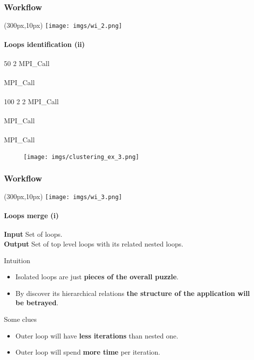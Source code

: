 \documentclass{beamer}
\begin{document}
\begin{frame}
\frametitle{Workflow}
\begin{textblock*}{5cm}(300px,10px) %
	\texttt{[image: imgs/wi\_2.png]}
\end{textblock*}
\framesubtitle{Loops identification (ii)}
\begin{multicols}{2}
		\begin{pseudocode}{ }{ }
			  50 \DO
			\BEGIN
				  2 \DO
				\BEGIN
					MPI\_Call \\
				\END \\
				MPI\_Call\\
			\END\\
			  100 \DO
			\BEGIN
				  2 \DO
				\BEGIN
					  2 \DO
					\BEGIN
						MPI\_Call \\
					\END\\
					MPI\_Call\\
				\END \\
				MPI\_Call\\
			\END
		\end{pseudocode}
	\columnbreak
	
	\columnbreak
	\pause
	\begin{figure}
		\texttt{[image: imgs/clustering\_ex\_3.png]}
	\end{figure}
\end{multicols}
\end{frame}

\begin{frame}
\frametitle{Workflow}
\begin{textblock*}{5cm}(300px,10px) %
	\texttt{[image: imgs/wi\_3.png]}
\end{textblock*}
\framesubtitle{Loops merge (i)}
\begin{mdframed}[backgroundcolor=blue!10,roundcorner=10pt,linewidth=0pt]
\textbf{Input} Set of loops.\\
\textbf{Output} Set of top level loops with its related nested loops.
\end{mdframed}
\vspace{10px}
\pause
Intuition
\begin{itemize}
	\item Isolated loops are just \textbf{pieces of the overall puzzle}.
	\item By discover its hierarchical relations \textbf{the structure of the application will be betrayed}.
\end{itemize}
\pause
Some clues
\begin{itemize}
	\item Outer loop will have \textbf{less iterations} than nested one.
	\item Outer loop will spend \textbf{more time} per iteration.
\end{itemize}
\end{frame}
\end{document}
